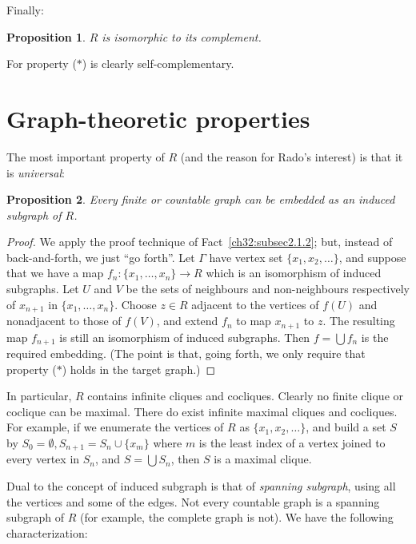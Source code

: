 \documentclass[12pt]{article}
\newtheorem{proposition}{Proposition}
\begin{document}
Finally:
\begin{proposition}\label{ch32:prop3.5} 
$R$ is isomorphic to its complement.
\end{proposition}

For property ($\ast$) is clearly self-complementary.

\section{Graph-theoretic properties}%
\label{ch32:sec2.4}

The most important property of $R$ (and the reason for Rado's
interest) is that it is \emph{universal}: 

\begin{proposition}\label{ch32:prop4.1} 
Every finite or countable graph can be embedded
as an induced subgraph of $R$.
\end{proposition}
\begin{proof}
We apply the proof technique of Fact~\ref{ch32:subsec2.1.2}; 
but, instead of back-and-forth, we
just ``go forth''. Let $\Gamma$ have vertex set $\{x_1,
x_2,\ldots\}$, and suppose that we have a map $f_n : \{x_1,
\ldots,x_n\} \rightarrow R$ which is an isomorphism of induced
subgraphs. Let $U$ and $V$ be the sets of neighbours and
non-neighbours respectively of $x_{n+1}$ in $\{x_1, \ldots,x_n\}$.
Choose $z \in R$ adjacent to the vertices of $f(U)$ and nonadjacent
to those of $f(V)$, and extend $f_n$ to map $x_{n+1}$ to $z$. The
resulting map $f_{n+1}$ is still an isomorphism of induced
subgraphs. Then $f = \bigcup f_n$ is the required embedding. (The
point is that, going forth, we only require that property ($\ast$)
holds in the target graph.)
\end{proof}

In particular, $R$ contains infinite cliques and cocliques. Clearly
no finite clique or coclique can be maximal. There do exist infinite
maximal cliques and cocliques. For example, if we enumerate the
vertices of $R$ as $\{x_1, x_2, \ldots\}$, and build a set $S$ by
$S_0 = \emptyset, S_{n +1} = S_n \cup \{x_m\}$ where $m$ is the
least index of a vertex joined to every vertex in $S_n$, and $S =
\bigcup S_n$, then $S$ is a maximal clique.

Dual to the concept of induced subgraph is that of \emph{spanning
subgraph}, using all the vertices and some of the edges. Not every
countable graph is a spanning subgraph of $R$ (for example, the
complete graph is not). We have the following characterization:
\end{document}
